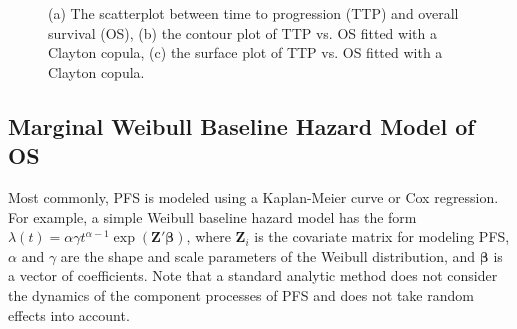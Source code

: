 \documentclass[aoas]{imsart}
\theoremstyle{plain}
\theoremstyle{remark}
\begin{document}
\begin{figure}
\centering
{}\label{fig:scatter}
\label{fig:contour}
\label{fig:surface}
\caption{(a) The scatterplot between time to progression (TTP) and overall survival (OS), (b) the contour plot of TTP vs. OS fitted with a Clayton copula, (c) the surface plot of TTP vs. OS fitted with a Clayton copula. \label{fig:copula}}
\end{figure}

\subsection{Marginal Weibull Baseline Hazard Model of OS}\label{sec:method_standard}

Most commonly, PFS is modeled using a Kaplan-Meier curve or Cox regression. For example, a simple Weibull baseline hazard model has the form
$\lambda(t)=\alpha \gamma t^{\alpha-1} \exp(\textbf{Z}' \boldsymbol{\beta})$,
where $\textbf{Z}_i$ is the covariate matrix for modeling PFS, $\alpha$ and $\gamma$ are the shape and scale parameters of the Weibull distribution, and $\boldsymbol{\beta}$ is a vector of coefficients. Note that a standard analytic method does not consider the dynamics of the component processes of PFS and does not take random effects into account.
\end{document}
